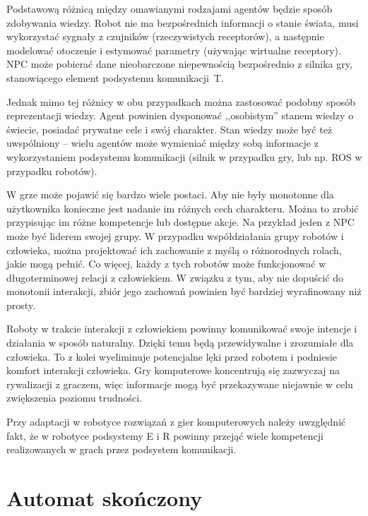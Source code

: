 Podstawową różnicą między omawianymi rodzajami agentów będzie sposób zdobywania wiedzy. Robot nie ma bezpośrednich informacji o stanie świata, musi wykorzystać sygnały z czujników (rzeczywistych receptorów), a następnie modelować otoczenie i estymować parametry (używając wirtualne receptory). NPC może pobierać dane nieobarczone niepewnością bezpośrednio z silnika gry, stanowiącego element podsystemu komunikacji~T.

Jednak mimo tej różnicy w obu przypadkach można zastosować podobny sposób reprezentacji wiedzy. Agent powinien dysponować ,,osobistym'' stanem wiedzy o świecie, posiadać prywatne cele i swój charakter. Stan wiedzy może być też uwspólniony – wielu agentów może wymieniać między sobą informacje z wykorzystaniem podsystemu komunikacji (silnik w przypadku gry, lub np. ROS w przypadku robotów).

W grze może pojawić się bardzo wiele postaci. Aby nie były monotonne dla użytkownika konieczne jest nadanie im różnych cech charakteru. Można to zrobić przypisując im różne kompetencje lub dostępne akcje. Na przykład jeden z NPC może być liderem swojej grupy. W przypadku współdziałania grupy robotów i człowieka, można projektować ich zachowanie z myślą o różnorodnych rolach, jakie mogą pełnić. Co więcej, każdy z tych robotów może funkcjonować w długoterminowej relacji z człowiekiem. W związku z tym, aby nie dopuścić do monotonii interakcji, zbiór jego zachowań powinien być bardziej wyrafinowany niż prosty.

Roboty w trakcie interakcji z człowiekiem powinny komunikować swoje intencje i działania w sposób naturalny. Dzięki temu będą przewidywalne i zrozumiałe dla człowieka. To z kolei wyeliminuje potencjalne lęki przed robotem i podniesie komfort interakcji człowieka. Gry komputerowe koncentrują się zazwyczaj na rywalizacji z graczem, więc informacje mogą być przekazywane niejawnie w celu zwiększenia poziomu trudności.

Przy adaptacji w robotyce rozwiązań z gier komputerowych należy uwzględnić fakt, że w robotyce podsystemy E i R powinny przejąć wiele kompetencji realizowanych w grach przez podsystem komunikacji.


\section{Automat skończony}

